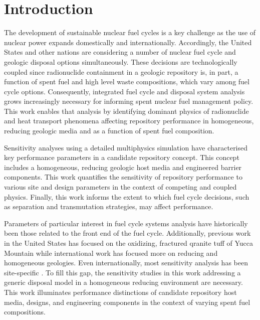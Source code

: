
\section{Introduction}

The development of sustainable nuclear fuel cycles is a key challenge as the use 
of nuclear power expands domestically and internationally. Accordingly, the 
United States and other nations are considering a number of nuclear fuel cycle 
and geologic disposal options simultaneously. These decisions are 
technologically coupled since radionuclide containment in a geologic 
repository is, in part, a function of spent fuel and high level waste 
compositions, which vary among fuel cycle options. Consequently, integrated 
fuel cycle and disposal system analysis grows increasingly necessary for 
informing spent nuclear fuel management policy.  This work enables that analysis 
by identifying dominant physics of radionuclide and heat transport phenomena 
affecting repository performance in homogeneous, reducing geologic media and as 
a function of spent fuel composition. 

Sensitivity analyses using a detailed multiphysics simulation have characterised 
key performance parameters in a candidate repository concept. This concept 
includes a homogeneous, reducing geologic host media and engineered barrier 
components.  This work quantifies the sensitivity of repository performance to 
various site and design parameters in the context of competing and coupled 
physics. Finally, this work informs the extent to which fuel cycle decisions, 
such as separation and transmutation strategies, may 
affect performance.

Parameters of particular interest in fuel cycle systems analysis have 
historically been those related to the front end of the fuel cycle.  
Additionally, previous work in the United States has focused on the oxidizing, 
fractured qranite tuff of Yucca Mountain while international work has focused 
more on reducing and homogeneous geologies. Even internationally, most 
sensitivity analysis has been site-specific \cite{von_lensa_red-impact_2008}. To 
fill this gap, the sensitivity studies in this work addressing a generic disposal 
model in a homogeneous reducing environment are necessary. This work illuminates 
performance distinctions of candidate repository host media, designs, and 
engineering components in the context of varying spent fuel compositions. 
